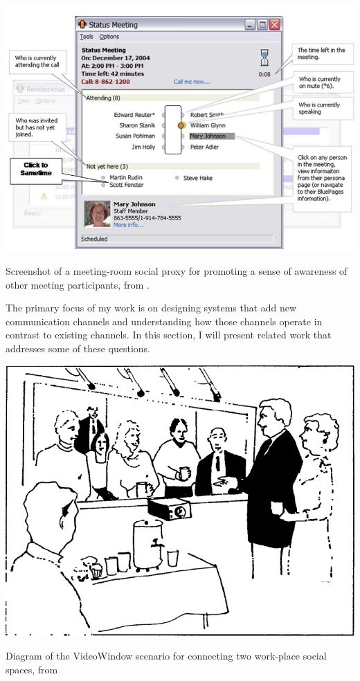 \documentclass{tufte-handout}
\begin{document}
\begin{marginfigure}
	\includegraphics{figures/kellog_social_proxies.png}
	\caption{Screenshot of a meeting-room social proxy for promoting a sense of awareness of other meeting participants, from \citep{kellogg_leveraging_2006}.}
	\label{fig:social-proxies}
\end{marginfigure}

The primary focus of my work is on designing systems that add new communication channels and understanding how those channels operate in contrast to existing channels. In this section, I will present related work that addresses some of these questions.

\begin{marginfigure}
	\includegraphics{figures/videowindow.png}
	\caption{Diagram of the VideoWindow scenario for connecting two work-place social spaces, from \citep{Fish:1990fn}}
	\label{fig:videowindow}
\end{marginfigure}
\end{document}
